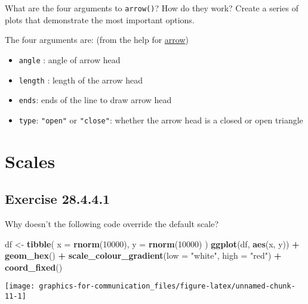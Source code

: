 \documentclass[]{book}
\newenvironment{Shaded}{\begin{snugshade}}{\end{snugshade}}
\newcommand{\DataTypeTok}[1]{\textcolor[rgb]{0.13,0.29,0.53}{#1}}
\newcommand{\DecValTok}[1]{\textcolor[rgb]{0.00,0.00,0.81}{#1}}
\newcommand{\KeywordTok}[1]{\textcolor[rgb]{0.13,0.29,0.53}{\textbf{#1}}}
\newcommand{\NormalTok}[1]{#1}
\newcommand{\OperatorTok}[1]{\textcolor[rgb]{0.81,0.36,0.00}{\textbf{#1}}}
\newcommand{\StringTok}[1]{\textcolor[rgb]{0.31,0.60,0.02}{#1}}
\providecommand{\tightlist}{%
  \setlength{\itemsep}{0pt}\setlength{\parskip}{0pt}}
\theoremstyle{plain}
\theoremstyle{remark}
\begin{document}
What are the four arguments to \texttt{arrow()}? How do they work?
Create a series of plots that demonstrate the most important options.

The four arguments are: (from the help for
\href{https://www.rdocumentation.org/packages/grid/versions/3.3.2/topics/arrow}{arrow})

\begin{itemize}
\tightlist
\item
  \texttt{angle} : angle of arrow head
\item
  \texttt{length} : length of the arrow head
\item
  \texttt{ends}: ends of the line to draw arrow head
\item
  \texttt{type}: \texttt{"open"} or \texttt{"close"}: whether the arrow
  head is a closed or open triangle
\end{itemize}

\hypertarget{scales}{%
\section{Scales}\label{scales}}

\hypertarget{exercise-28.4.4.1}{%
\subsection*{\texorpdfstring{Exercise
{28.4.4.1}}{Exercise 28.4.4.1}}\label{exercise-28.4.4.1}}

Why doesn't the following code override the default scale?

\begin{Shaded}
\begin{Highlighting}[]
\NormalTok{df <-}\StringTok{ }\KeywordTok{tibble}\NormalTok{(}
  \DataTypeTok{x =} \KeywordTok{rnorm}\NormalTok{(}\DecValTok{10000}\NormalTok{),}
  \DataTypeTok{y =} \KeywordTok{rnorm}\NormalTok{(}\DecValTok{10000}\NormalTok{)}
\NormalTok{)}
\KeywordTok{ggplot}\NormalTok{(df, }\KeywordTok{aes}\NormalTok{(x, y)) }\OperatorTok{+}
\StringTok{  }\KeywordTok{geom_hex}\NormalTok{() }\OperatorTok{+}
\StringTok{  }\KeywordTok{scale_colour_gradient}\NormalTok{(}\DataTypeTok{low =} \StringTok{"white"}\NormalTok{, }\DataTypeTok{high =} \StringTok{"red"}\NormalTok{) }\OperatorTok{+}
\StringTok{  }\KeywordTok{coord_fixed}\NormalTok{()}
\end{Highlighting}
\end{Shaded}

\begin{center}\texttt{[image: graphics-for-communication\_files/figure-latex/unnamed-chunk-11-1]} \end{center}
\end{document}
